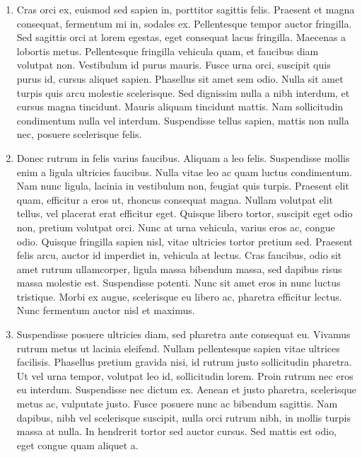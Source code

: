 \documentclass[11pt]{awe-homework}
\begin{document}
\begin{enumerate}
\item Cras orci ex, euismod sed sapien in, porttitor sagittis felis. Praesent et magna consequat, fermentum mi in, sodales ex. Pellentesque tempor auctor fringilla. Sed sagittis orci at lorem egestas, eget consequat lacus fringilla. Maecenas a lobortis metus. Pellentesque fringilla vehicula quam, et faucibus diam volutpat non. Vestibulum id purus mauris. Fusce urna orci, suscipit quis purus id, cursus aliquet sapien. Phasellus sit amet sem odio. Nulla sit amet turpis quis arcu molestie scelerisque. Sed dignissim nulla a nibh interdum, et cursus magna tincidunt. Mauris aliquam tincidunt mattis. Nam sollicitudin condimentum nulla vel interdum. Suspendisse tellus sapien, mattis non nulla nec, posuere scelerisque felis.
\item Donec rutrum in felis varius faucibus. Aliquam a leo felis. Suspendisse mollis enim a ligula ultricies faucibus. Nulla vitae leo ac quam luctus condimentum. Nam nunc ligula, lacinia in vestibulum non, feugiat quis turpis. Praesent elit quam, efficitur a eros ut, rhoncus consequat magna. Nullam volutpat elit tellus, vel placerat erat efficitur eget. Quisque libero tortor, suscipit eget odio non, pretium volutpat orci. Nunc at urna vehicula, varius eros ac, congue odio. Quisque fringilla sapien nisl, vitae ultricies tortor pretium sed. Praesent felis arcu, auctor id imperdiet in, vehicula at lectus. Cras faucibus, odio sit amet rutrum ullamcorper, ligula massa bibendum massa, sed dapibus risus massa molestie est. Suspendisse potenti. Nunc sit amet eros in nunc luctus tristique. Morbi ex augue, scelerisque eu libero ac, pharetra efficitur lectus. Nunc fermentum auctor nisl et maximus.
\item Suspendisse posuere ultricies diam, sed pharetra ante consequat eu. Vivamus rutrum metus ut lacinia eleifend. Nullam pellentesque sapien vitae ultrices facilisis. Phasellus pretium gravida nisi, id rutrum justo sollicitudin pharetra. Ut vel urna tempor, volutpat leo id, sollicitudin lorem. Proin rutrum nec eros eu interdum. Suspendisse nec dictum ex. Aenean et justo pharetra, scelerisque metus ac, vulputate justo. Fusce posuere nunc ac bibendum sagittis. Nam dapibus, nibh vel scelerisque suscipit, nulla orci rutrum nibh, in mollis turpis massa at nulla. In hendrerit tortor sed auctor cursus. Sed mattis est odio, eget congue quam aliquet a.
\end{enumerate}
\end{document}
